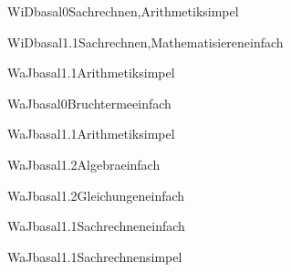 \documentclass[12pt]{article}
\begin{document}
\begin{Add}{WiD}{basal0}{Sachrechnen,Arithmetik}{simpel}
\end{Add}

\begin{Add}{WiD}{basal1.1}{Sachrechnen,Mathematisieren}{einfach}
\end{Add}


\begin{Add}{WaJ}{basal1.1}{Arithmetik}{simpel}
\end{Add}

\begin{Add}{WaJ}{basal0}{Bruchterme}{einfach}
\end{Add}

\begin{Add}{WaJ}{basal1.1}{Arithmetik}{simpel}
\end{Add}

\begin{Add}{WaJ}{basal1.2}{Algebra}{einfach}
\end{Add}

\begin{Add}{WaJ}{basal1.2}{Gleichungen}{einfach}
\end{Add}

\begin{Add}{WaJ}{basal1.1}{Sachrechnen}{einfach}
\end{Add}

\begin{Add}{WaJ}{basal1.1}{Sachrechnen}{simpel}
\end{Add}
\end{document}
